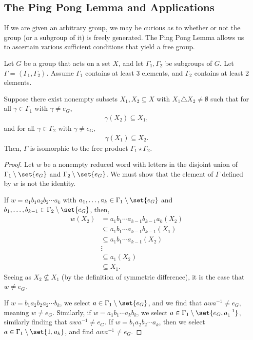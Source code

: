 \subsection{The Ping Pong Lemma and Applications}%
If we are given an arbitrary group, we may be curious as to whether or not the group (or a subgroup of it) is freely generated. The Ping Pong Lemma allows us to ascertain various sufficient conditions that yield a free group.
\begin{theorem}
  Let $G$ be a group that acts on a set $X$, and let $\Gamma_1,\Gamma_2$ be subgroups of $G$. Let $\Gamma = \left\langle \Gamma_1,\Gamma_2 \right\rangle$. Assume $\Gamma_1$ contains at least $3$ elements, and $\Gamma_2$ contains at least $2$ elements.\newline

  Suppose there exist nonempty subsets $X_1,X_2\subseteq X$ with $X_1\triangle X_2 \neq \emptyset$ such that for all $\gamma\in \Gamma_1$ with $\gamma \neq e_{G}$,
  \begin{align*}
    \gamma\left(X_2\right)\subseteq X_1,
  \end{align*}
  and for all $\gamma \in \Gamma_2$ with $\gamma \neq e_G$,
  \begin{align*}
    \gamma\left(X_1\right)\subseteq X_2.
  \end{align*}
  Then, $\Gamma$ is isomorphic to the free product $\Gamma_1\star \Gamma_2$.\label{thm:ping_pong}
\end{theorem}
\begin{proof}
  Let $w$ be a nonempty reduced word with letters in the disjoint union of $\Gamma_1\setminus \set{e_G}$ and $\Gamma_2\setminus \set{e_G}$. We must show that the element of $\Gamma$ defined by $w$ is not the identity.\newline

  If $w = a_1b_1a_2b_2\cdots a_k$ with $a_1,\dots,a_k\in \Gamma_1\setminus \set{e_G}$ and $b_1,\dots,b_{k-1}\in \Gamma_{2}\setminus \set{e_G}$, then,
  \begin{align*}
    w\left(X_2\right) &= a_1b_1\cdots a_{k-1}b_{k-1}a_k\left(X_2\right)\\
                      &\subseteq a_1b_1\cdots a_{k-1}b_{k-1}\left(X_1\right)\\
                      &\subseteq a_1b_1\cdots a_{k-1}\left(X_2\right)\\
                      &\vdots\\
                      &\subseteq a_1\left(X_2\right)\\
                      &\subseteq X_1.
  \end{align*}
  Seeing as $X_2\nsubseteq X_1$ (by the definition of symmetric difference), it is the case that $w\neq e_{G}$.\newline

  If $w = b_1a_2b_2a_2\cdots b_k$, we select $a\in \Gamma_1\setminus \set{e_G}$, and we find that $awa^{-1}\neq e_G$, meaning $w\neq e_G$. Similarly, if $w = a_1b_1\cdots a_kb_k$, we select $a\in \Gamma_1\setminus \set{e_G,a_{1}^{-1}}$, similarly finding that $awa^{-1}\neq e_{G}$. If $w = b_1a_2b_2\cdots a_k$, then we select $a\in \Gamma_1\setminus \set{1,a_k}$, and find $awa^{-1}\neq e_G$.
\end{proof}

